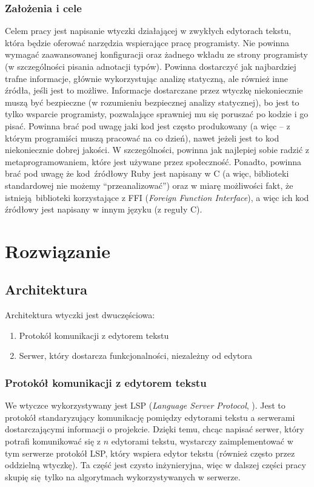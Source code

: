 \documentclass[shortabstract,mgr]{iithesis}
\begin{document}
\subsection{Założenia i cele}

Celem pracy jest napisanie wtyczki działającej w zwykłych edytorach tekstu, która będzie oferować narzędzia wspierające pracę programisty.
Nie powinna wymagać zaawansowanej konfiguracji oraz żadnego wkładu ze strony programisty (w szczególności pisania adnotacji typów).
Powinna dostarczyć jak najbardziej trafne informacje, głównie wykorzystując analizę statyczną, ale również inne źródła, jeśli jest to możliwe.
Informacje dostarczane przez wtyczkę niekoniecznie muszą być bezpieczne (w rozumieniu bezpiecznej analizy statycznej), bo jest to tylko wsparcie programisty, pozwalające sprawniej mu się poruszać po kodzie i go pisać.
Powinna brać pod uwagę jaki kod jest często produkowany (a więc -- z którym programiści muszą pracować na co dzień), nawet jeżeli jest to kod niekoniecznie dobrej jakości.
W szczególności, powinna jak najlepiej sobie radzić z metaprogramowaniem, które jest używane przez społeczność.
Ponadto, powinna brać pod uwagę że kod źródłowy Ruby jest napisany w C (a więc, biblioteki standardowej nie możemy ``przeanalizować'') oraz w miarę możliwości fakt, że istnieją biblioteki korzystające z FFI (\textit{Foreign Function Interface}), a więc ich kod źródłowy jest napisany w innym języku (z reguły C).

\chapter{Rozwiązanie}

\section{Architektura}

Architektura wtyczki jest dwuczęściowa:
\begin{enumerate}
\item Protokół komunikacji z edytorem tekstu
\item Serwer, który dostarcza funkcjonalności, niezależny od edytora
\end{enumerate}

\subsection{Protokół komunikacji z edytorem tekstu}

We wtyczce wykorzystywany jest LSP (\textit{Language Server Protocol}, \cite{LSP}).
Jest to protokół standaryzujący komunikację pomiędzy edytorami tekstu a serwerami dostarczającymi informacji o projekcie.
Dzięki temu, chcąc napisać serwer, który potrafi komunikować się z $n$ edytorami tekstu, wystarczy zaimplementować w tym serwerze protokół LSP, który wspiera edytor tekstu (również często przez oddzielną wtyczkę). Ta część jest czysto inżynieryjna, więc w dalszej części pracy skupię się tylko na algorytmach wykorzystywanych w serwerze.
\end{document}
